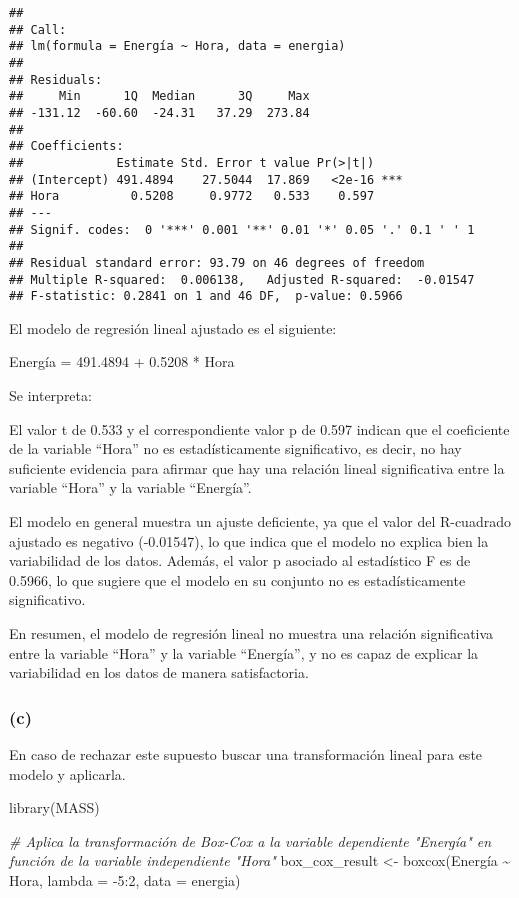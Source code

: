 \documentclass[
]{article}
\newenvironment{Shaded}{\begin{snugshade}}{\end{snugshade}}
\newcommand{\AttributeTok}[1]{\textcolor[rgb]{0.77,0.63,0.00}{#1}}
\newcommand{\CommentTok}[1]{\textcolor[rgb]{0.56,0.35,0.01}{\textit{#1}}}
\newcommand{\DecValTok}[1]{\textcolor[rgb]{0.00,0.00,0.81}{#1}}
\newcommand{\FunctionTok}[1]{\textcolor[rgb]{0.00,0.00,0.00}{#1}}
\newcommand{\NormalTok}[1]{#1}
\newcommand{\OtherTok}[1]{\textcolor[rgb]{0.56,0.35,0.01}{#1}}
\newcommand{\SpecialCharTok}[1]{\textcolor[rgb]{0.00,0.00,0.00}{#1}}
\begin{document}
\begin{verbatim}
## 
## Call:
## lm(formula = Energía ~ Hora, data = energia)
## 
## Residuals:
##     Min      1Q  Median      3Q     Max 
## -131.12  -60.60  -24.31   37.29  273.84 
## 
## Coefficients:
##             Estimate Std. Error t value Pr(>|t|)    
## (Intercept) 491.4894    27.5044  17.869   <2e-16 ***
## Hora          0.5208     0.9772   0.533    0.597    
## ---
## Signif. codes:  0 '***' 0.001 '**' 0.01 '*' 0.05 '.' 0.1 ' ' 1
## 
## Residual standard error: 93.79 on 46 degrees of freedom
## Multiple R-squared:  0.006138,   Adjusted R-squared:  -0.01547 
## F-statistic: 0.2841 on 1 and 46 DF,  p-value: 0.5966
\end{verbatim}

El modelo de regresión lineal ajustado es el siguiente:

Energía = 491.4894 + 0.5208 * Hora

Se interpreta:

El valor t de 0.533 y el correspondiente valor p de 0.597 indican que el
coeficiente de la variable ``Hora'' no es estadísticamente
significativo, es decir, no hay suficiente evidencia para afirmar que
hay una relación lineal significativa entre la variable ``Hora'' y la
variable ``Energía''.

El modelo en general muestra un ajuste deficiente, ya que el valor del
R-cuadrado ajustado es negativo (-0.01547), lo que indica que el modelo
no explica bien la variabilidad de los datos. Además, el valor p
asociado al estadístico F es de 0.5966, lo que sugiere que el modelo en
su conjunto no es estadísticamente significativo.

En resumen, el modelo de regresión lineal no muestra una relación
significativa entre la variable ``Hora'' y la variable ``Energía'', y no
es capaz de explicar la variabilidad en los datos de manera
satisfactoria.

\hypertarget{c-3}{%
\subsubsection{(c)}\label{c-3}}

En caso de rechazar este supuesto buscar una transformación lineal para
este modelo y aplicarla.

\begin{Shaded}
\begin{Highlighting}[]
\FunctionTok{library}\NormalTok{(MASS)}

\CommentTok{\# Aplica la transformación de Box{-}Cox a la variable dependiente "Energía" en función de la variable independiente "Hora"}
\NormalTok{box\_cox\_result }\OtherTok{\textless{}{-}} \FunctionTok{boxcox}\NormalTok{(Energía }\SpecialCharTok{\textasciitilde{}}\NormalTok{ Hora, }\AttributeTok{lambda =} \SpecialCharTok{{-}}\DecValTok{5}\SpecialCharTok{:}\DecValTok{2}\NormalTok{, }\AttributeTok{data =}\NormalTok{ energia)}
\end{Highlighting}
\end{Shaded}
\end{document}
